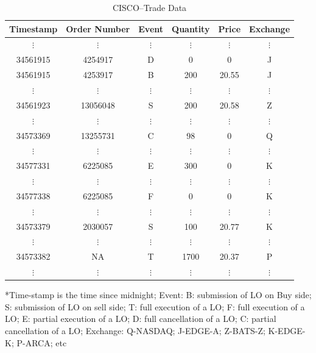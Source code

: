 	\begin{table}[!ht]
   	\centering
   	\caption{CISCO--Trade Data \label{tab:CISCO}}
   	\begin{tabular}{cccccc} 
	Timestamp & Order Number & Event & Quantity & Price & Exchange \\ \hline
	$\vdots$ & $\vdots$ & $\vdots$ & $\vdots$ & $\vdots$ & $\vdots$ \\
	34561915 & 4254917 & D & 0 & 0 & J \\
	34561915 & 4253917 & B & 200 & 20.55 & J \\
	$\vdots$ & $\vdots$ & $\vdots$ & $\vdots$ & $\vdots$ & $\vdots$ \\
	34561923 & 13056048 & S & 200 & 20.58 & Z \\
	$\vdots$ & $\vdots$ & $\vdots$ & $\vdots$ & $\vdots$ & $\vdots$ \\
	34573369 & 13255731 & C & 98 & 0 & Q \\
	$\vdots$ & $\vdots$ & $\vdots$ & $\vdots$ & $\vdots$ & $\vdots$ \\
	34577331 & 6225085 & E & 300 & 0 & K \\
	$\vdots$ & $\vdots$ & $\vdots$ & $\vdots$ & $\vdots$ & $\vdots$ \\
	34577338 & 6225085 & F & 0 & 0 & K \\
	$\vdots$ & $\vdots$ & $\vdots$ & $\vdots$ & $\vdots$ & $\vdots$ \\
	34573379 & 2030057 & S & 100 & 20.77 & K \\
	$\vdots$ & $\vdots$ & $\vdots$ & $\vdots$ & $\vdots$ & $\vdots$ \\
	34573382 & NA & T & 1700 & 20.37 & P \\
	$\vdots$ & $\vdots$ & $\vdots$ & $\vdots$ & $\vdots$ & $\vdots$ 
   	\end{tabular}
	\begin{minipage}[t]{1\textwidth}
	\small{*Time-stamp is the time since midnight; Event: B: submission of LO on Buy side; S: submission of LO on sell side; T: full execution of a LO; F: full execution of a LO; E: partial execution of a LO; D: full cancellation of a LO; C: partial cancellation of a LO; Exchange: Q-NASDAQ; J-EDGE-A; Z-BATS-Z; K-EDGE-K; P-ARCA; etc}
	\end{minipage}
	\end{table}


